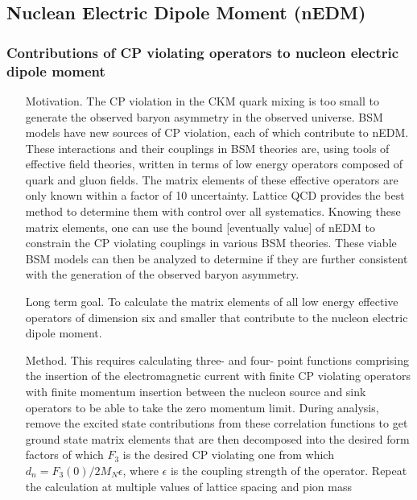 \documentclass[prd,showpacs,showkeys,preprintnumbers,floatfix,
nofootinbib%
]{revtex4-2}
\begin{document}
\subsection{Nuclean Electric Dipole Moment (nEDM)}\label{sec:nEDM}

\subsubsection{Contributions of CP violating operators to nucleon electric dipole moment}
\begin{itemize}
    \item[Motivation.] The CP violation in the CKM quark mixing is too
      small to generate the observed baryon asymmetry in the observed
      universe.  BSM models have new sources of CP violation, each of
      which contribute to nEDM. These interactions and their couplings
      in BSM theories are, using tools of effective field theories,
      written in terms of low energy operators composed of quark and
      gluon fields. The matrix elements of these effective operators
      are only known within a factor of 10 uncertainty.  Lattice QCD
      provides the best method to determine them with control over all
      systematics. Knowing these matrix elements, one can use the bound
      [eventually value] of nEDM to constrain the CP violating
      couplings in various BSM theories.  These viable BSM models can
      then be analyzed to determine if they are further consistent
      with the generation of the observed baryon asymmetry.
    \item[Long term goal.] To calculate the matrix elements of all low
      energy effective operators of dimension six 
      and smaller that contribute to the nucleon electric dipole moment. 
    \item[Method.] This requires calculating three- and four- point
      functions comprising the insertion of the electromagnetic
      current with finite CP violating operators with finite momentum
      insertion between the nucleon source and sink operators to be
      able to take the zero momentum limit.  During analysis, remove
      the excited state contributions from these correlation functions
      to get ground state matrix elements that are then decomposed
      into the desired form factors of which $F_3$ is the desired CP
      violating one from which $d_n = F_3(0)/2 M_N \epsilon$, where
      $\epsilon $ is the coupling strength of the operator. Repeat the
      calculation at multiple values of lattice spacing and pion mass

\end{itemize}
\end{document}
